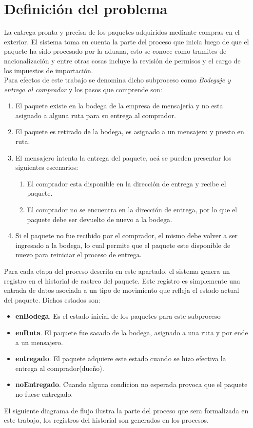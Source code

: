 \documentclass[12pt,a4paper]{article}
\begin{document}
\section{Definición del problema}
La entrega pronta y precisa de los paquetes adquiridos mediante compras en el exterior. El sistema toma en cuenta la parte del proceso que inicia luego de que el paquete ha sido procesado por la aduana, esto se conoce como tramites de nacionalización y entre otras cosas incluye la revisión de permisos y el cargo de los impuestos de importación. \\Para efectos de este trabajo se denomina dicho subproceso como \textit{Bodegaje y entrega al comprador} y los pasos que comprende son:
\begin{enumerate}
\item El paquete existe en la bodega de la empresa de mensajería y no esta asignado a alguna ruta para su entrega al comprador.
\item El paquete es retirado de la bodega, es asignado a un mensajero y puesto en ruta.
\item El mensajero intenta la entrega del paquete, acá se pueden presentar los siguientes escenarios:
\begin{enumerate}
\item El comprador esta disponible en la dirección de entrega y recibe el paquete.
\item El comprador no se encuentra en la dirección de entrega, por lo que el paquete debe ser devuelto de nuevo a la bodega.
\end{enumerate}
\item Si el paquete no fue recibido por el comprador, el mismo debe volver a ser ingresado a la bodega, lo cual permite que el paquete este disponible de nuevo para reiniciar el proceso de entrega.
\end{enumerate}

Para cada etapa del proceso descrita en este apartado, el sistema genera un registro en el historial de rastreo del paquete. Este registro es simplemente una entrada de datos asociada a un tipo de movimiento que refleja el estado actual del paquete. Dichos estados son:
\begin{itemize}
\item \textbf{enBodega}. Es el estado inicial de los paquetes para este subproceso
\item \textbf{enRuta}. El paquete fue sacado de la bodega, asignado a una ruta y por ende a un mensajero.
\item \textbf{entregado}. El paquete adquiere este estado cuando se hizo efectiva la entrega al comprador(dueño).
\item \textbf{noEntregado}. Cuando alguna condicion no esperada provoca que el paquete no fuese entregado.
\end{itemize}
El siguiente diagrama de flujo ilustra la parte del proceso que sera formalizada en este trabajo, los registros del historial son generados en los procesos.
\end{document}
